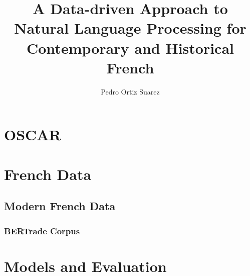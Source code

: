 \documentclass{mimosis}
\title{A Data-driven Approach to Natural Language Processing for Contemporary and Historical French}
\author{Pedro Ortiz Suarez}
\begin{document}
\frontmatter



\tableofcontents

\mainmatter







\part{OSCAR}







\part{French Data}

\chapter{Modern French Data}
\section{BERTrade Corpus}

\part{Models and Evaluation}






\appendix




\backmatter

\begingroup
\let\clearpage\relax
\glsaddall
\printglossary[type=\acronymtype]
\newpage
\printglossary
\endgroup

\printindex





\end{document}
